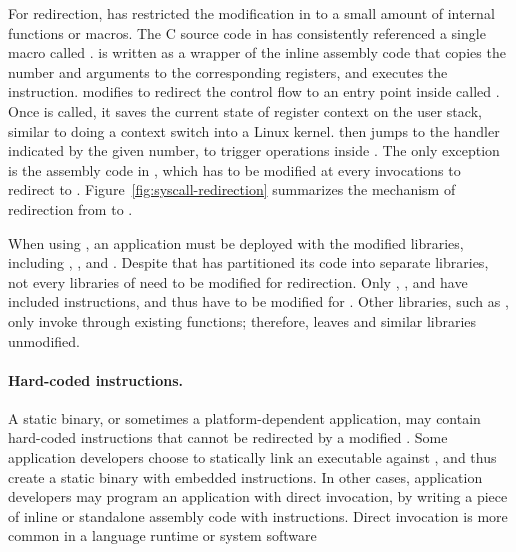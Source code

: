 For \linuxapi{} redirection,
\graphene{} has restricted the modification in \glibc{}
to a small amount of
internal functions or macros.
The C source code in \glibc{} has consistently referenced a single macro called
.
 is written as a wrapper of the inline assembly code
that copies the \linuxapi{} number and arguments to the corresponding registers,
and executes the  instruction.
\graphene{} modifies 
to redirect the control flow to
an entry point inside \thelibos{} called .
Once  is called, it saves the current state of register context on the user stack, similar to doing a context switch into a Linux kernel.
 then jumps to the \linuxapi{} handler
indicated by the given \linuxapi{} number, to trigger operations inside \thelibos{}.
The only exception is the assembly code in \glibc{}, which has
to be modified at every \linuxapi{} invocations to redirect to .
Figure~\ref{fig:syscall-redirection} summarizes the mechanism of \linuxapi{} redirection
from \glibc{} to \thelibos{}.


When using \graphene{}, an application must be deployed with the modified \libc{} libraries,
including , \libpthread{}, and \libdl{}.
Despite that \glibc{} has partitioned its code into separate libraries, not every libraries of \glibc{} need to be modified for \linuxapi{} redirection.
Only , \libpthread{}, and \libdl{} have included  instructions,
and thus have to be modified for \graphene{}.
Other \libc{} libraries, such as ,
only invoke \linuxapis{} through existing \libc{} functions;
therefore, \graphene{} leaves  and similar \libc{} libraries unmodified.



\paragraph{Hard-coded  instructions.}
A static binary, or sometimes a platform-dependent application, may contain hard-coded  instructions
that cannot be redirected by a modified \libc{}.
Some application developers choose to statically link an executable against \libc{},
and thus create a static binary
with embedded  instructions.
In other cases, application developers may program an application
with direct \linuxapi{} invocation,
by writing a piece of inline or standalone assembly code with
 instructions.
Direct \linuxapi{} invocation is more common in a language runtime or system software


